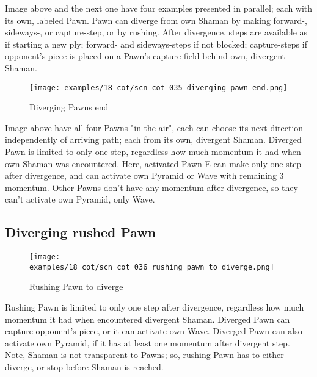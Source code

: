 \vspace*{-0.5\baselineskip}
Image above and the next one have four examples presented in parallel; each with
its own, labeled Pawn.\newline
\indent
Pawn can diverge from own Shaman by making forward-, sideways-, or capture-step,
or by rushing. After divergence, steps are available as if starting a new ply;
forward- and sideways-steps if not blocked; capture-steps if opponent's piece is
placed on a Pawn's capture-field behind own, divergent Shaman.

\clearpage %

\vspace*{-2.1\baselineskip}
\noindent
\begin{figure}[!h]
\texttt{[image: examples/18\_cot/scn\_cot\_035\_diverging\_pawn\_end.png]}
\vspace*{-1.3\baselineskip}
\caption{Diverging Pawns end}
\label{fig:scn_cot_035_diverging_pawn_end}
\end{figure}

\vspace*{-0.4\baselineskip}
Image above have all four Pawns "in the air", each can choose its next direction
independently of arriving path; each from its own, divergent Shaman.\newline
\indent
Diverged Pawn is limited to only one step, regardless how much momentum it had
when own Shaman was encountered. Here, activated Pawn E can make only one step
after divergence, and can activate own Pyramid or Wave with remaining 3 momentum.
Other Pawns don't have any momentum after divergence, so they can't activate own
Pyramid, only Wave.

\clearpage %

\subsection*{Diverging rushed Pawn}
\label{sec:Conquest of Tlalocan/Divergence/Diverging rushed Pawn}

\vspace*{-0.7\baselineskip}
\noindent
\begin{wrapfigure}[14]{l}{0.4\textwidth}
\centering
\texttt{[image: examples/18\_cot/scn\_cot\_036\_rushing\_pawn\_to\_diverge.png]}
\vspace*{-0.4\baselineskip}
\caption{Rushing Pawn to diverge}
\label{fig:scn_cot_036_rushing_pawn_to_diverge}
\end{wrapfigure}
Rushing Pawn is limited to only one step after divergence, regardless how much
momentum it had when encountered divergent Shaman. Diverged Pawn can capture
opponent's piece, or it can activate own Wave. Diverged Pawn can also activate
own Pyramid, if it has at least one momentum after divergent step.\newline
\indent
Note, Shaman is not transparent to Pawns; so, rushing Pawn has to either diverge,
or stop before Shaman is reached.

